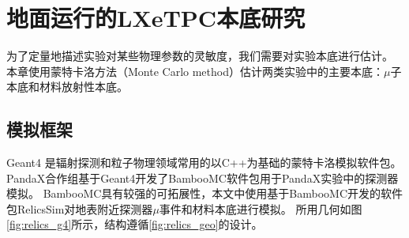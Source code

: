 
\chapter{地面运行的LXeTPC本底研究}
\label{sec:backgrounds}

为了定量地描述实验对某些物理参数的灵敏度，我们需要对实验本底进行估计。
本章使用蒙特卡洛方法（Monte Carlo method）估计两类实验中的主要本底：$\mu$子本底和材料放射性本底。

\section{模拟框架}

Geant4 是辐射探测和粒子物理领域常用的以C++为基础的蒙特卡洛模拟软件包\cite{agostinelli_geant4simulation_2003,allison_geant4_2006,allison_recent_2016}。
PandaX合作组基于Geant4开发了BambooMC软件包用于PandaX实验中的探测器模拟\cite{chen_bamboomc_2021}。
BambooMC具有较强的可拓展性，本文中使用基于BambooMC开发的软件包RelicsSim对地表附近探测器$\mu$事件和材料本底进行模拟。
所用几何如图\ref{fig:relics_g4}所示，结构遵循\ref{fig:relics_geo}的设计。

